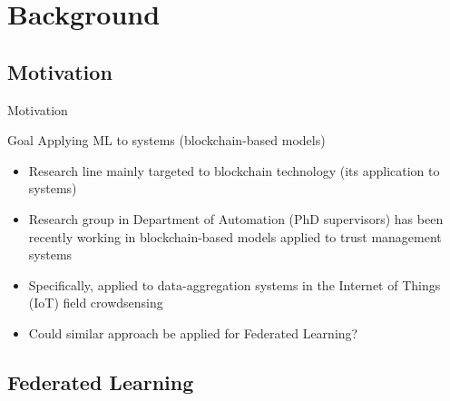 

\section{Background}

\subsection{Motivation}

\begin{frame}{Motivation}
	\begin{block}{Goal}
        Applying ML to systems (blockchain-based models)
      \end{block}
  \begin{itemize}
    \item Research line mainly targeted to \alert{blockchain technology} (its application to systems)
    \item Research group in Department of Automation (PhD supervisors) has been recently working in blockchain-based models applied to \alert{trust management systems}
	\item Specifically, applied to data-aggregation systems in the Internet of Things (IoT) field \alert{crowdsensing}
	\item Could similar approach be applied for \alert{Federated Learning}?
  \end{itemize}
\end{frame}

\subsection{Federated Learning}

